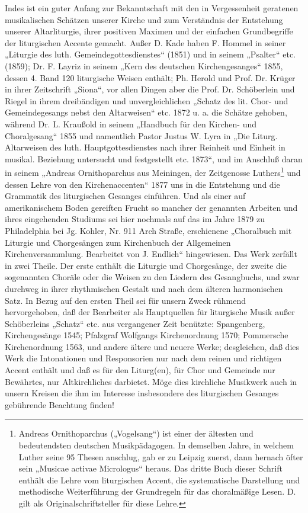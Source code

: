 Indes ist ein guter Anfang zur Bekanntschaft mit den in Vergessenheit geratenen musikalischen Schätzen unserer Kirche und zum Verständnis der Entstehung unserer Altarliturgie, ihrer positiven Maximen und der einfachen Grundbegriffe der liturgischen Accente gemacht. Außer D. Kade haben F. Hommel in seiner „Liturgie des luth. Gemeindegottesdienstes“ (1851) und in seinem „Psalter“ etc. (1859); Dr. F. Layriz in seinem „Kern des deutschen Kirchengesanges“ 1855, dessen 4. Band 120 liturgische Weisen enthält; Ph. Herold und Prof. Dr. Krüger in ihrer Zeitschrift „Siona“, vor allen Dingen aber die Prof. Dr. Schöberlein und Riegel in ihrem dreibändigen und unvergleichlichen „Schatz des lit. Chor- und Gemeindegesangs nebst den Altarweisen“ etc. 1872 u. a. die Schätze gehoben, während Dr. L. Kraußold in seinem „Handbuch für den Kirchen- und Choralgesang“ 1855 und namentlich Pastor Justus W. Lyra in „Die Liturg. Altarweisen des luth. Hauptgottesdienstes nach ihrer Reinheit und Einheit in musikal. Beziehung untersucht und festgestellt etc. 1873“, und im Anschluß daran in seinem „Andreas Ornithoparchus aus Meiningen, der Zeitgenosse Luthers\footnote{Andreas Ornithoparchus („Vogelsang“) ist einer der ältesten und bedeutendsten deutschen Musikpädagogen. In demselben Jahre, in welchem Luther seine 95 Thesen anschlug, gab er zu Leipzig zuerst, dann hernach öfter sein „Musicae activae Micrologus“ heraus. Das dritte Buch dieser Schrift enthält die Lehre vom liturgischen Accent, die systematische Darstellung und methodische Weiterführung der Grundregeln für das choralmäßige Lesen. D. gilt als Originalschriftsteller für diese Lehre.} und dessen Lehre von den Kirchenaccenten“ 1877 uns in die Entstehung und die Grammatik des liturgischen Gesanges einführen. Und als einer auf amerikanischem Boden gereiften Frucht so mancher der genannten Arbeiten und ihres eingehenden Studiums sei hier nochmals auf das im Jahre 1879 zu Philadelphia bei Jg. Kohler, Nr. 911 Arch Straße, erschienene „Choralbuch mit Liturgie und Chorgesängen zum Kirchenbuch der Allgemeinen Kirchenversammlung. Bearbeitet von J. Endlich“ hingewiesen. Das Werk zerfällt in zwei Theile. Der erste enthält die Liturgie und Chorgesänge, der zweite die sogenannten Choräle oder die Weisen zu den Liedern des Gesangbuchs, und zwar durchweg in ihrer rhythmischen Gestalt und nach dem älteren harmonischen Satz. In
Bezug auf den ersten Theil sei für unsern Zweck rühmend hervorgehoben, daß der Bearbeiter als Hauptquellen für liturgische Musik außer Schöberleins „Schatz“ etc. aus vergangener Zeit benützte: Spangenberg, Kirchengesänge 1545; Pfalzgraf Wolfgangs Kirchenordnung 1570; Pommersche Kirchenordnung 1563, und andere ältere und neuere Werke; desgleichen, daß dies Werk die Intonationen und Responsorien nur nach dem reinen und richtigen Accent enthält und daß es für den Liturg(en), für Chor und Gemeinde nur Bewährtes, nur Altkirchliches darbietet. Möge dies kirchliche Musikwerk auch in unsern Kreisen die ihm im Interesse insbesondere des liturgischen Gesanges gebührende Beachtung finden!


